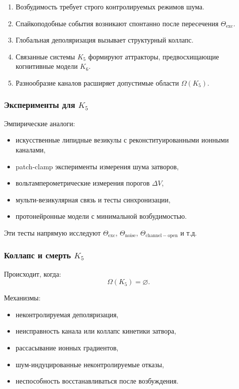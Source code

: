 \begin{enumerate}
    \item Возбудимость требует строго контролируемых режимов шума.
    \item Спайкоподобные события возникают спонтанно после пересечения
          $\Theta_{\mathrm{exc}}$.
    \item Глобальная деполяризация вызывает структурный коллапс.
    \item Связанные системы $K_5$ формируют аттракторы, предвосхищающие
          когнитивные модели $K_6$.
    \item Разнообразие каналов расширяет допустимые области $\Omega(K_5)$.
\end{enumerate}

\subsubsection{Эксперименты для \texorpdfstring{$K_5$}{K_5}}

Эмпирические аналоги:
\begin{itemize}
    \item искусственные липидные везикулы с реконституированными ионными
          каналами,
    \item patch-clamp эксперименты измерения шума затворов,
    \item вольтамперометрические измерения порогов $\Delta V$,
    \item мульти-везикулярная связь и тесты синхронизации,
    \item протонейронные модели с минимальной возбудимостью.
\end{itemize}

Эти тесты напрямую исследуют $\Theta_{\mathrm{exc}}$, $\Theta_{\mathrm{noise}}$,
$\Theta_{\mathrm{channel-open}}$ и т.д.

\subsubsection{Коллапс и смерть \texorpdfstring{$K_5$}{K_5}}

Происходит, когда:
\[
\Omega(K_5) = \varnothing.
\]

Механизмы:
\begin{itemize}
    \item неконтролируемая деполяризация,
    \item неисправность канала или коллапс кинетики затвора,
    \item рассасывание ионных градиентов,
    \item шум-индуцированные неконтролируемые отказы,
    \item неспособность восстанавливаться после возбуждения.
\end{itemize}

